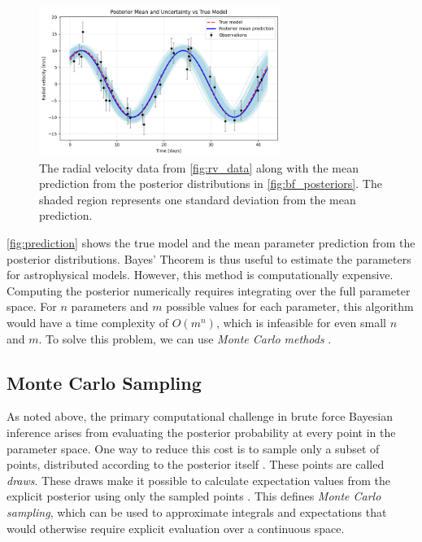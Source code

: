 \documentclass[preprint,longauthor]{aastex631}
\numberwithin{equation}{section}
\begin{document}
\begin{figure}[ht!]
\centering
\includegraphics[width=0.7\textwidth]{../scripts/2.2/figures/prediction.png}
\caption{The radial velocity data from \autoref{fig:rv_data} along with the mean prediction from the posterior distributions in \autoref{fig:bf_posteriors}. The shaded region represents one standard deviation from the mean prediction.}
\label{fig:prediction}
\end{figure}

\autoref{fig:prediction} shows the true model and the mean parameter prediction from the posterior distributions. Bayes' Theorem is thus useful to estimate the parameters for astrophysical models. However, this method is computationally expensive. Computing the posterior numerically requires integrating over the full parameter space. For $n$ parameters and $m$ possible values for each parameter, this algorithm would have a time complexity of $O(m^n)$, which is infeasible for even small $n$ and $m$. To solve this problem, we can use \textit{Monte Carlo methods} \citep{brewer1BayesianInference2018}.

\subsection{Monte Carlo Sampling}
As noted above, the primary computational challenge in brute force Bayesian inference arises from evaluating the posterior probability at every point in the parameter space. One way to reduce this cost is to sample only a subset of points, distributed according to the posterior itself \citep{vontoussaintBayesianInferencePhysics2011}. These points are called \textit{draws}. These draws make it possible to calculate expectation values from the explicit posterior using only the sampled points \citep{vontoussaintBayesianInferencePhysics2011}. This defines \textit{Monte Carlo sampling}, which can be used to approximate integrals and expectations that would otherwise require explicit evaluation over a continuous space.
\end{document}
